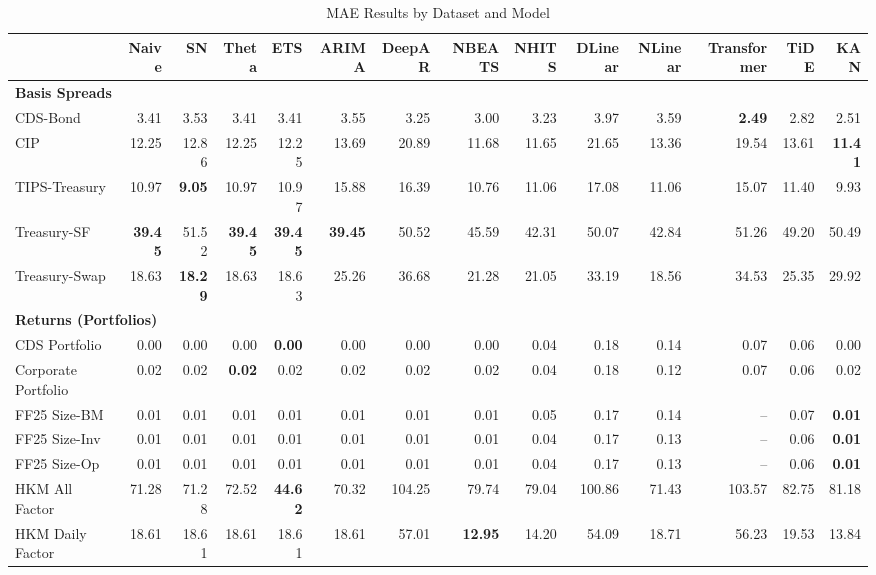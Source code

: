 
\begin{table}[htbp]
\centering
\caption{MAE Results by Dataset and Model}
\label{tab:mae_results}
\scriptsize
\setlength{\tabcolsep}{1.5pt}
\renewcommand{\arraystretch}{0.9}
\begin{tabular}{@{}lrrrrrrrrrrrrr@{}}
\toprule
 & Naive & SN & Theta & ETS & ARIMA & DeepAR & NBEATS & NHITS & DLinear & NLinear & Transformer & TiDE & KAN \\
\midrule
\multicolumn{14}{l}{\textbf{Basis Spreads}} \\
CDS-Bond & 3.41 & 3.53 & 3.41 & 3.41 & 3.55 & 3.25 & 3.00 & 3.23 & 3.97 & 3.59 & \textbf{2.49} & 2.82 & 2.51 \\
CIP & 12.25 & 12.86 & 12.25 & 12.25 & 13.69 & 20.89 & 11.68 & 11.65 & 21.65 & 13.36 & 19.54 & 13.61 & \textbf{11.41} \\
TIPS-Treasury & 10.97 & \textbf{9.05} & 10.97 & 10.97 & 15.88 & 16.39 & 10.76 & 11.06 & 17.08 & 11.06 & 15.07 & 11.40 & 9.93 \\
Treasury-SF & \textbf{39.45} & 51.52 & \textbf{39.45} & \textbf{39.45} & \textbf{39.45} & 50.52 & 45.59 & 42.31 & 50.07 & 42.84 & 51.26 & 49.20 & 50.49 \\
Treasury-Swap & 18.63 & \textbf{18.29} & 18.63 & 18.63 & 25.26 & 36.68 & 21.28 & 21.05 & 33.19 & 18.56 & 34.53 & 25.35 & 29.92 \\
\midrule
\multicolumn{14}{l}{\textbf{Returns (Portfolios)}} \\
CDS Portfolio & 0.00 & 0.00 & 0.00 & \textbf{0.00} & 0.00 & 0.00 & 0.00 & 0.04 & 0.18 & 0.14 & 0.07 & 0.06 & 0.00 \\
Corporate Portfolio & 0.02 & 0.02 & \textbf{0.02} & 0.02 & 0.02 & 0.02 & 0.02 & 0.04 & 0.18 & 0.12 & 0.07 & 0.06 & 0.02 \\
FF25 Size-BM & 0.01 & 0.01 & 0.01 & 0.01 & 0.01 & 0.01 & 0.01 & 0.05 & 0.17 & 0.14 & -- & 0.07 & \textbf{0.01} \\
FF25 Size-Inv & 0.01 & 0.01 & 0.01 & 0.01 & 0.01 & 0.01 & 0.01 & 0.04 & 0.17 & 0.13 & -- & 0.06 & \textbf{0.01} \\
FF25 Size-Op & 0.01 & 0.01 & 0.01 & 0.01 & 0.01 & 0.01 & 0.01 & 0.04 & 0.17 & 0.13 & -- & 0.06 & \textbf{0.01} \\
HKM All Factor & 71.28 & 71.28 & 72.52 & \textbf{44.62} & 70.32 & 104.25 & 79.74 & 79.04 & 100.86 & 71.43 & 103.57 & 82.75 & 81.18 \\
HKM Daily Factor & 18.61 & 18.61 & 18.61 & 18.61 & 18.61 & 57.01 & \textbf{12.95} & 14.20 & 54.09 & 18.71 & 56.23 & 19.53 & 13.84 \\

\end{tabular}
\end{table}
